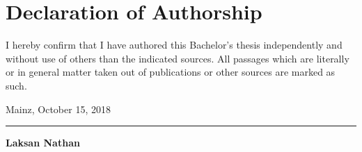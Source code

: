 
\chapter*{Declaration of Authorship}

I hereby confirm that I have authored this Bachelor's
thesis independently and without use of others than the indicated
sources. All passages which are literally or in general matter
taken out of publications or other sources are marked as such.
\vspace{0.5cm}

Mainz, October 15, 2018 \vspace{1.5cm} 


\noindent\rule{9cm}{0.5pt} \vspace{0.1cm}

\bf{Laksan Nathan}